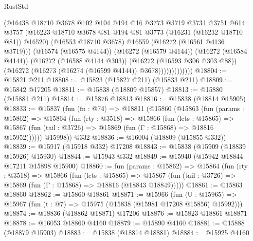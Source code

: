 \begin{lexlean}{RustStd}
\begin{coremodule}
                          (@16438
                            @18710
                            @3678
                            @102
                            @104
                            @194
                            @16
                            @3773
                            @3719
                            @3731
                            @3751
                            @614
                            @3757
                            (@16223
                              @18710
                              @3678
                              @81
                              @194
                              @81
                              @3773
                              (@16231 (@16232 @18710 @81))
                              @16520)
                            (@16553 @18710 @3678)
                            @16559
                            (@16272 (@16561 @4136 @3719)))
                          (@16574 (@16575 @4144))
                          (@16272 (@16579 @4144))
                          (@16272 (@16584 @4144))
                          (@16272 (@16588 @4144 @303))
                          (@16272 (@16593 @306 @303 @88))
                          (@16272 (@16273 (@16274 (@16599 @4144)) @3678)))))))))))))
@18804 := @15821 @211
@18808 := @15823 (@15827 @211) (@15833 @211)
@18809 := @15842 @17205
@18811 := @15838 (@18809 @15857)
@18813 := @15880 (@15881 @211)
@18814 := @15876 @18813
@18816 := @15838 (@18814 @15905)
@18833 := @15837
    (fun (fn : @74) =>
    @18811
      (@15860
        (@15863
          (fun (params : @15862) =>
          @15864
            (fun (rty : @3518) =>
            @15866
              (fun (lets : @15865) =>
              @15867 (fun (tail : @3726) => @15869 (fun (Γ : @15868) => @18816 @15952))))))
        @15998))
    @332
@18836 := @16004 (@18809 (@15855 @332))
@18839 := @15917 (@15918 @332) @17208
@18843 := @15838 (@15909 (@18839 @15926) @15930)
@18844 := @15943 @332
@18849 := @15940 (@15942 @18844 @17211 @15898 @15900)
@18860 := fun (params : @15862) =>
  @15864
    (fun (rty : @3518) =>
    @15866
      (fun (lets : @15865) =>
      @15867 (fun (tail : @3726) => @15869 (fun (Γ : @15868) => @18816 (@18843 @18849)))))
@18861 := @15863 @18860
@18862 := @15860 @18861
@18871 := @15966
    (fun (U : @15965) => @15967 (fun (t : @7) => @15975 (@15838 (@15981 @17208 @15856) @15992)))
@18874 := @18836 (@18862 @18871) @17206
@18876 := @15823 @18861 @18871
@18878 := @16053 @18860 @4160
@18879 := @15890 @4160
@18881 := @15888 (@18879 @15903)
@18883 := @15838 (@18814 @18881)
@18884 := @15925 @4160

\end{coremodule}
\end{lexlean}
